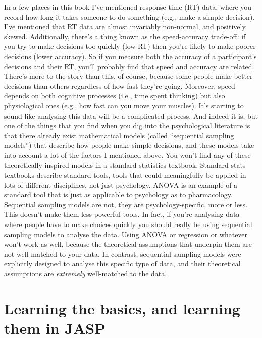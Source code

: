 \begin{itemize}
 In a few places in this book I've mentioned response time (RT) data, where you record how long it takes someone to do something (e.g., make a simple decision). I've mentioned that RT data are almost invariably non-normal, and positively skewed. Additionally, there's a thing known as the speed-accuracy trade-off: if you try to make decisions too quickly (low RT) then you're likely to make poorer decisions (lower accuracy). So if you measure both the accuracy of a participant's decisions and their RT, you'll probably find that speed and accuracy are related. There's more to the story than this, of course, because some people make better decisions than others regardless of how fast they're going. Moreover, speed depends on both cognitive processes (i.e., time spent thinking) but also physiological ones (e.g., how fast can you move your muscles). It's starting to sound like analysing this data will be a complicated process. And indeed it is, but one of the things that you find when you dig into the psychological literature is that there already exist mathematical models (called ``sequential sampling models'') that describe how people make simple decisions, and these models take into account a lot of the factors I mentioned above. You won't find any of these theoretically-inspired models in a standard statistics textbook. Standard stats textbooks describe standard tools, tools that could meaningfully be applied in lots of different disciplines, not just psychology. ANOVA is an example of a standard tool that is just as applicable to psychology as to pharmacology. Sequential sampling models are not, they are psychology-specific, more or less. This doesn't make them less powerful tools. In fact, if you're analysing data where people have to make choices quickly you should really be using sequential sampling models to analyse the data. Using ANOVA or regression or whatever won't work as well, because the theoretical assumptions that underpin them are not well-matched to your data. In contrast, sequential sampling models were explicitly designed to analyse this specific type of data, and their theoretical assumptions are {\it extremely} well-matched to the data. 
\end{itemize}

\section{Learning the basics, and learning them in JASP}

